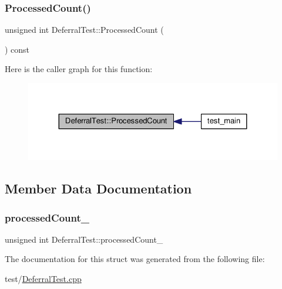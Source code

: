 \mbox{\label{struct_deferral_test_ac3989277695cfc48e85b6918ae95672d}} 
\subsubsection{\texorpdfstring{Processed\+Count()}{ProcessedCount()}}
{\footnotesize\ttfamily unsigned int Deferral\+Test\+::\+Processed\+Count (\begin{DoxyParamCaption}{ }\end{DoxyParamCaption}) const\hspace{0.3cm}{\ttfamily [inline]}}

Here is the caller graph for this function\+:
\nopagebreak
\begin{figure}[H]
\begin{center}
\leavevmode
\includegraphics[width=324pt]{struct_deferral_test_ac3989277695cfc48e85b6918ae95672d_icgraph}
\end{center}
\end{figure}


\subsection{Member Data Documentation}
\mbox{\label{struct_deferral_test_afbc3997824b7be76460443e3a9f9bde2}} 
\subsubsection{\texorpdfstring{processed\+Count\+\_\+}{processedCount\_}}
{\footnotesize\ttfamily unsigned int Deferral\+Test\+::processed\+Count\+\_\+\hspace{0.3cm}{\ttfamily [private]}}



The documentation for this struct was generated from the following file\+:\begin{DoxyCompactItemize}
\item 
test/\mbox{\hyperlink{_deferral_test_8cpp}{Deferral\+Test.\+cpp}}\end{DoxyCompactItemize}
